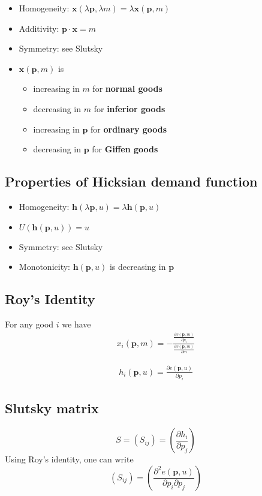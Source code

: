 \documentclass[a4paper] {scrartcl}
\begin{document}
\begin{itemize}
	\item Homogeneity: $\mathbf{x}(\lambda\mathbf{ p}, \lambda m) = \lambda\mathbf{x}(\mathbf{p}, m)$
	\item Additivity: $\mathbf{p}\cdot \mathbf{x} = m$
	\item Symmetry: see Slutsky
	\item $\mathbf{x}(\mathbf{p}, m)$ is 
	\begin{itemize}
		\item increasing in $m$ for \textbf{normal goods}
		\item decreasing in $m$ for \textbf{inferior goods}
		\item increasing in $\mathbf{p}$ for \textbf{ordinary goods}
		\item decreasing in $\mathbf{p}$ for \textbf{Giffen goods}
	\end{itemize}
	
\end{itemize}


\subsection{Properties of Hicksian demand function}
\begin{itemize}
	\item Homogeneity: $\mathbf{h}(\lambda \mathbf{p}, u) = \lambda \mathbf{h}(\mathbf{p},u)$
	\item $U(\mathbf{h}(\mathbf{p},u))=u$
	\item Symmetry: see Slutsky
	\item Monotonicity: $\mathbf{h}(\mathbf{p}, u)$ is decreasing in $\mathbf{p}$
\end{itemize}


\subsection{Roy's Identity}
For any good $i$ we have
\begin{eqnarray}
	x_i(\mathbf{p}, m) = -\frac{\frac{\partial v(\mathbf{p},m)}{\partial p_i}}{\frac{\partial v(\mathbf{p},m)}{\partial m}}
\end{eqnarray}

\begin{eqnarray}
	h_i(\mathbf{p},u) = \frac{\partial e(\mathbf{p},u)}{\partial p_i}
\end{eqnarray}


\subsection{Slutsky matrix}
\begin{equation}
	S = (S_{ij}) = \left(\frac{\partial h_i}{\partial p_j}\right)
\end{equation}
Using Roy's identity, one can write
\begin{equation}
	(S_{ij}) = \left(\frac{\partial^2 e(\mathbf{p},u)}{\partial p_i\partial p_j}\right)
\end{equation}
\end{document}
